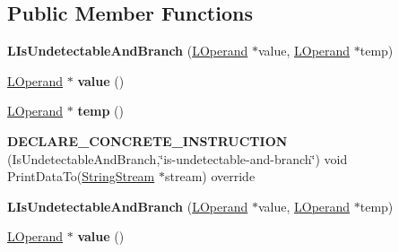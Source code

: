 \subsection*{Public Member Functions}
\begin{DoxyCompactItemize}
\item 
{\bfseries L\+Is\+Undetectable\+And\+Branch} (\hyperlink{classv8_1_1internal_1_1_l_operand}{L\+Operand} $\ast$value, \hyperlink{classv8_1_1internal_1_1_l_operand}{L\+Operand} $\ast$temp)\hypertarget{classv8_1_1internal_1_1_l_is_undetectable_and_branch_a48333769d21d80135872b3e667e8c882}{}\label{classv8_1_1internal_1_1_l_is_undetectable_and_branch_a48333769d21d80135872b3e667e8c882}

\item 
\hyperlink{classv8_1_1internal_1_1_l_operand}{L\+Operand} $\ast$ {\bfseries value} ()\hypertarget{classv8_1_1internal_1_1_l_is_undetectable_and_branch_aea79e90e070e85f96e2dca54b3b26773}{}\label{classv8_1_1internal_1_1_l_is_undetectable_and_branch_aea79e90e070e85f96e2dca54b3b26773}

\item 
\hyperlink{classv8_1_1internal_1_1_l_operand}{L\+Operand} $\ast$ {\bfseries temp} ()\hypertarget{classv8_1_1internal_1_1_l_is_undetectable_and_branch_abc3e4f5ebade89f5f49c3e6e416e9c1d}{}\label{classv8_1_1internal_1_1_l_is_undetectable_and_branch_abc3e4f5ebade89f5f49c3e6e416e9c1d}

\item 
{\bfseries D\+E\+C\+L\+A\+R\+E\+\_\+\+C\+O\+N\+C\+R\+E\+T\+E\+\_\+\+I\+N\+S\+T\+R\+U\+C\+T\+I\+ON} (Is\+Undetectable\+And\+Branch,\char`\"{}is-\/undetectable-\/and-\/branch\char`\"{}) void Print\+Data\+To(\hyperlink{classv8_1_1internal_1_1_string_stream}{String\+Stream} $\ast$stream) override\hypertarget{classv8_1_1internal_1_1_l_is_undetectable_and_branch_a28ae934f22deb295f07eed93dfd358ba}{}\label{classv8_1_1internal_1_1_l_is_undetectable_and_branch_a28ae934f22deb295f07eed93dfd358ba}

\item 
{\bfseries L\+Is\+Undetectable\+And\+Branch} (\hyperlink{classv8_1_1internal_1_1_l_operand}{L\+Operand} $\ast$value, \hyperlink{classv8_1_1internal_1_1_l_operand}{L\+Operand} $\ast$temp)\hypertarget{classv8_1_1internal_1_1_l_is_undetectable_and_branch_a48333769d21d80135872b3e667e8c882}{}\label{classv8_1_1internal_1_1_l_is_undetectable_and_branch_a48333769d21d80135872b3e667e8c882}

\item 
\hyperlink{classv8_1_1internal_1_1_l_operand}{L\+Operand} $\ast$ {\bfseries value} ()\hypertarget{classv8_1_1internal_1_1_l_is_undetectable_and_branch_aea79e90e070e85f96e2dca54b3b26773}{}\label{classv8_1_1internal_1_1_l_is_undetectable_and_branch_aea79e90e070e85f96e2dca54b3b26773}


\end{DoxyCompactItemize}

